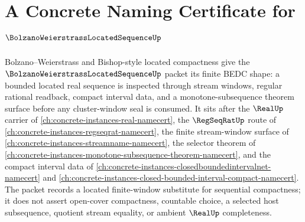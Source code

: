 \chapter{A Concrete Naming Certificate for $\BolzanoWeierstrassLocatedSequenceUp$}
\label{ch:concrete-instances-bolzano-weierstrass-located-sequence-namecert}

Bolzano--Weierstrass and Bishop-style located compactness give the $\BolzanoWeierstrassLocatedSequenceUp$ packet its finite BEDC shape: a bounded located real sequence is inspected through stream windows, regular rational readback, compact interval data, and a monotone-subsequence theorem surface before any cluster-window seal is consumed. It sits after the $\RealUp$ carrier of \autoref{ch:concrete-instances-real-namecert}, the $\RegSeqRatUp$ route of \autoref{ch:concrete-instances-regseqrat-namecert}, the finite stream-window surface of \autoref{ch:concrete-instances-streamname-namecert}, the selector theorem of \autoref{ch:concrete-instances-monotone-subsequence-theorem-namecert}, and the compact interval data of \autoref{ch:concrete-instances-closedboundedintervalnet-namecert} and \autoref{ch:concrete-instances-closed-bounded-interval-compact-namecert}. The packet records a located finite-window substitute for sequential compactness; it does not assert open-cover compactness, countable choice, a selected host subsequence, quotient stream equality, or ambient $\RealUp$ completeness.

